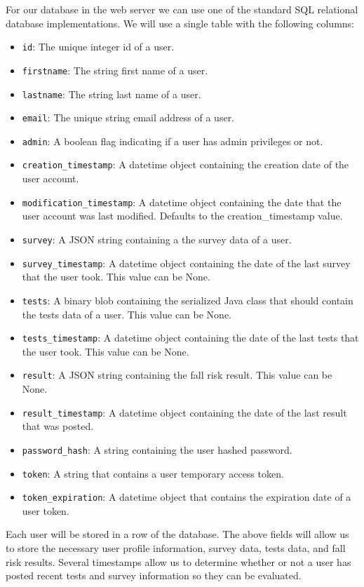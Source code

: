 \documentclass[conference]{IEEEtran}
\begin{document}
For our database in the web server we can use one of the standard SQL relational database implementations. We will use a single table with the following columns:
\begin{itemize}
\item \texttt{id}: The unique integer id of a user.
\item \texttt{firstname}: The string first name of a user.
\item \texttt{lastname}: The string last name of a user.
\item \texttt{email}: The unique string email address of a user.
\item \texttt{admin}: A boolean flag indicating if a user has admin privileges or not.
\item \texttt{creation\_timestamp}: A datetime object containing the creation date of the user account.
\item \texttt{modification\_timestamp}: A datetime object containing the date that the user account was last modified. Defaults to the creation\_timestamp value.
\item \texttt{survey}: A JSON string containing a the survey data of a user.
\item \texttt{survey\_timestamp}: A datetime object containing the date of the last survey that the user took. This value can be None.
\item \texttt{tests}: A binary blob containing the serialized Java class that should contain the tests data of a user. This value can be None.
\item \texttt{tests\_timestamp}: A datetime object containing the date of the last tests that the user took. This value can be None.
\item \texttt{result}: A JSON string containing the fall risk result. This value can be None.
\item \texttt{result\_timestamp}: A datetime object containing the date of the last result that was posted.
\item \texttt{password\_hash}: A string containing the user hashed password.
\item \texttt{token}: A string that contains a user temporary access token.
\item \texttt{token\_expiration}: A datetime object that contains the expiration date of a user token.
\end{itemize}
Each user will be stored in a row of the database. The above fields will allow us to store the necessary user profile information, survey data, tests data, and fall risk results. Several timestamps allow us to determine whether or not a user has posted recent tests and survey information so they can be evaluated.
\end{document}
